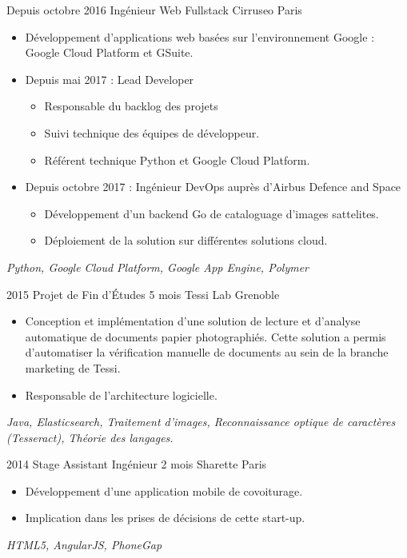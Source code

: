 \documentclass[11pt,a4paper,sans]{moderncv} %
\begin{document}
\cventry
    {Depuis octobre 2016}
    {Ingénieur Web Fullstack}
    {}
    {Cirruseo}
    {Paris}
    {
        \begin{itemize}
            \item Développement d'applications web basées sur l'environnement Google : Google Cloud Platform et GSuite.
            \item Depuis mai 2017 : Lead Developer
            \begin{itemize}
                \item Responsable du backlog des projets
                \item Suivi technique des équipes de développeur.
                \item Référent technique Python et Google Cloud Platform.
            \end{itemize}
                        \item Depuis octobre 2017 : Ingénieur DevOps auprès d'Airbus Defence and Space
            \begin{itemize}
                \item Développement d'un backend Go de cataloguage d'images sattelites.
                \item Déploiement de la solution sur différentes solutions cloud.
            \end{itemize}
        \end{itemize}
        \vspace*{1mm}
        \textit{Python, Google Cloud Platform, Google App Engine, Polymer}
    }

\cventry
    {2015}
    {Projet de Fin d'Études}
    {5 mois}
    {Tessi Lab}
    {Grenoble}
    {
        \begin{itemize}
            \item Conception et implémentation d'une solution de lecture et d'analyse automatique de documents papier photographiés. Cette solution a permis d'automatiser la vérification manuelle de documents au sein de la branche marketing de Tessi.
            \item Responsable de l'architecture logicielle.
        \end{itemize}
        \vspace*{1mm}
        \textit{Java, Elasticsearch, Traitement d'images, Reconnaissance optique de caractères (Tesseract), Théorie des langages.}
    }

\cventry
    {2014}
    {Stage Assistant Ingénieur}
    {2 mois}
    {Sharette}
    {Paris}
    {
        \begin{itemize}
            \item Développement d'une application mobile de covoiturage.
        \item Implication dans les prises de décisions de cette start-up.
        \end{itemize}
        \vspace*{1mm}
        \textit{HTML5, AngularJS, PhoneGap}
    }
\end{document}
